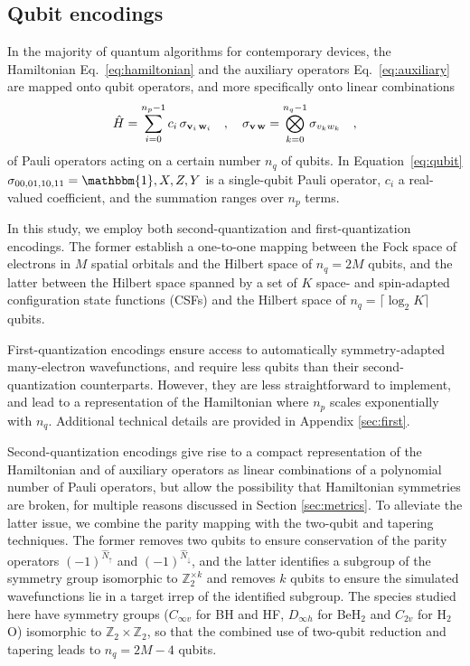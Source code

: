 \documentclass[aps,pra,onecolumn]{revtex4-2}
\newcommand{\vett}[1]{{\bf{#1}}}
\begin{document}
\subsection{Qubit encodings}

In the majority of quantum algorithms for contemporary devices, the Hamiltonian Eq.~\eqref{eq:hamiltonian} and the auxiliary operators Eq.~\eqref{eq:auxiliary} are mapped onto qubit operators,
and more specifically onto linear combinations 
\begin{equation}
\label{eq:qubit}
\hat{H} = \sum_{i=0}^{n_p-1} c_i \, \sigma_{\vett{v}_i \, \vett{w}_i} 
\quad,\quad
\sigma_{\vett{v} \, \vett{w}} = \bigotimes_{k=0}^{n_q-1} \sigma_{v_k w_k} 
\quad,
\end{equation}
of Pauli operators acting on a certain number $n_q$ of qubits. In Equation~\eqref{eq:qubit} $\sigma_{00,01,10,11} = \mathbbm{1},X,Z,Y$ is a single-qubit Pauli operator, 
$c_i$ a real-valued coefficient, and the summation ranges over $n_p$ terms.

In this study, we employ both second-quantization and first-quantization encodings.
The former establish a one-to-one mapping between the Fock space of electrons in $M$ spatial orbitals and the Hilbert space of $n_q = 2M$ qubits,
and the latter between the Hilbert space spanned by a set of $K$ space- and spin-adapted configuration state functions (CSFs) and the Hilbert space of $n_q = \lceil \log_2 K \rceil$ qubits.

First-quantization encodings ensure access to automatically symmetry-adapted many-electron wavefunctions, and require less qubits than their second-quantization counterparts.
However, they are less straightforward to implement, and lead to a representation of the Hamiltonian where $n_p$ scales exponentially with $n_q$.
Additional technical details are provided in Appendix \ref{sec:first}.

Second-quantization encodings give rise to a compact representation of the Hamiltonian and of auxiliary operators as linear combinations of a polynomial number of Pauli operators,
but allow the possibility that Hamiltonian symmetries are broken, for multiple reasons discussed in Section \ref{sec:metrics}.
To alleviate the latter issue, we combine the parity mapping with the two-qubit and tapering techniques. The former removes two qubits to ensure conservation of the parity operators
$(-1)^{\hat{N}_\uparrow}$ and $(-1)^{\hat{N}_\downarrow}$, and the latter identifies a subgroup of the symmetry group isomorphic to $\mathbb{Z}_2^{\times k}$ and removes $k$ qubits
to ensure the simulated wavefunctions lie in a target irrep of the identified subgroup. The species studied here have symmetry groups 
($C_{\infty v}$ for BH and HF, $D_{\infty h}$ for BeH$_2$ and $C_{2v}$ for H$_2$O) isomorphic to $\mathbb{Z}_2 \times \mathbb{Z}_2$, so that the combined use of two-qubit reduction
and tapering leads to $n_q = 2M-4$ qubits.
\end{document}
